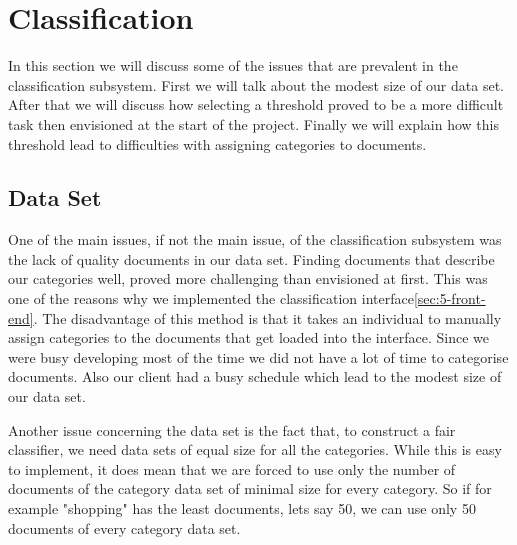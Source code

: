 
\section{Classification} \label{sec:discuss-classifier}
In this section we will discuss some of the issues that are prevalent in the classification subsystem. First we will talk about the modest size of our data set. After that we will discuss how selecting a threshold proved to be a more difficult task then envisioned at the start of the project. Finally we will explain how this threshold lead to difficulties with assigning categories to documents.\\

\subsection{Data Set}
One of the main issues, if not the main issue, of the classification subsystem was the lack of quality documents in our data set. Finding documents that describe our categories well, proved more challenging than envisioned at first. This was one of the reasons why we implemented the classification interface\ref{sec:5-front-end}. The disadvantage of this method is that it takes an individual to manually assign categories to the documents that get loaded into the interface. Since we were busy developing most of the time we did not have a lot of time to categorise documents. Also our client had a busy schedule which lead to the modest size of our data set.

Another issue concerning the data set is the fact that, to construct a fair classifier, we need data sets of equal size for all the categories. While this is easy to implement, it does mean that we are forced to use only the number of documents of the category data set of minimal size for every category. So if for example "shopping" has the least documents, lets say 50, we can use only 50 documents of every category data set.

